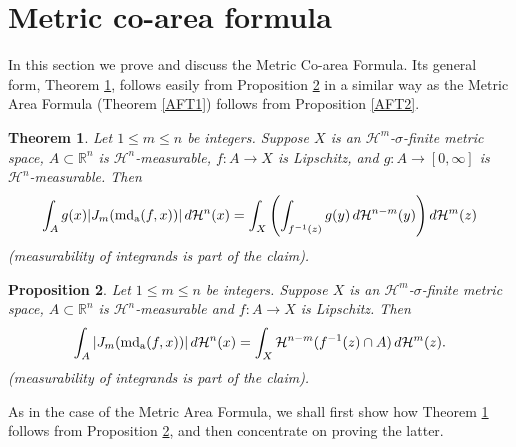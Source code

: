 \documentclass[12pt,leqno]{amsart}
\newtheorem{theorem}{Theorem}
\newtheorem{proposition}[theorem]{Proposition}
\theoremstyle{definition}
\newcommand{\bbbr}{\mathbb R}
\def\H{{\mathcal H}}
\def\apmd{\operatorname{md_{\rm a}}}
\numberwithin{theorem}{section} \numberwithin{equation}{section}
\begin{document}
\section{Metric co-area formula}
\label{MCOF}

In this section we prove and discuss the Metric Co-area Formula. Its general form, Theorem \ref{thm:gCoa}, follows easily from Proposition \ref{thm:Coa} in a similar way as the Metric Area Formula (Theorem \ref{AFT1}) follows from Proposition \ref{AFT2}.
\begin{theorem}\label{thm:gCoa}
Let $1\leq m\leq n$ be integers.
Suppose $X$ is an $\H^m$-$\sigma$-finite metric space, $A\subset\bbbr^n$ is $\H^n$-measurable, $f:A\to X$ is Lipschitz,  and $g:A\to [0,\infty]$ is $\H^n$-measurable. Then
\begin{equation}
\label{eq:gCoa}
\int_{A} g(x)|J_m(\apmd (f,x))|\,d\H^n(x)=\int_X\left( \int_{f^{-1}(z)}g(y)\,d\H^{n-m}(y)\right) d\H^m(z)
\end{equation}
(measurability of integrands is part of the claim).
\end{theorem}

\begin{proposition}
\label{thm:Coa}
Let $1\leq m\leq n$ be integers.
Suppose $X$ is an $\H^m$-$\sigma$-finite metric space, $A\subset \bbbr^n$ is $\H^n$-measurable and $f:A\to X$ is Lipschitz. Then
\begin{equation}\label{eq:mCoa}
    \int_A |J_m(\apmd(f,x))|\,d\H^n(x)=\int_X \H^{n-m}(f^{-1}(z)\cap A)\,d\H^m(z).
\end{equation}
(measurability of integrands is part of the claim).
\end{proposition}

As in the case of the Metric Area Formula, we shall first show how Theorem \ref{thm:gCoa} follows from Proposition \ref{thm:Coa}, and then concentrate on proving the latter.
\end{document}
